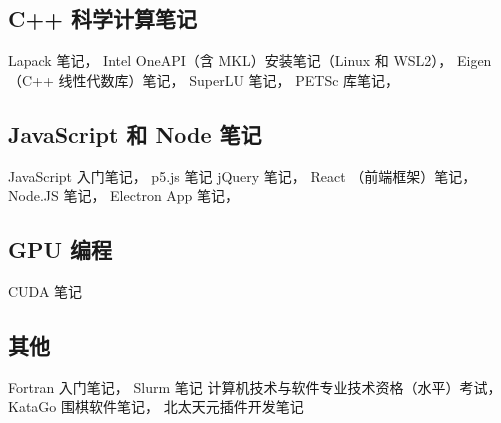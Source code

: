 \subsection{C++ 科学计算笔记}
Lapack 笔记，
Intel OneAPI（含 MKL）安装笔记（Linux 和 WSL2），
Eigen （C++ 线性代数库）笔记，
SuperLU 笔记，
PETSc 库笔记，

\subsection{JavaScript 和 Node 笔记}
JavaScript 入门笔记，
p5.js 笔记
jQuery 笔记，
React （前端框架）笔记，
Node.JS 笔记，
Electron App 笔记，

\subsection{GPU 编程}
CUDA 笔记

\subsection{其他}
Fortran 入门笔记，
Slurm 笔记
计算机技术与软件专业技术资格（水平）考试，
KataGo 围棋软件笔记，
北太天元插件开发笔记
